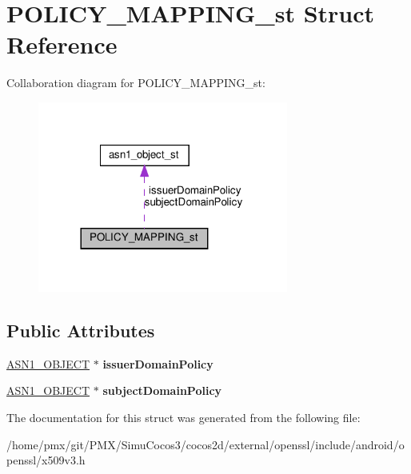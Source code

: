 \hypertarget{structPOLICY__MAPPING__st}{}\section{P\+O\+L\+I\+C\+Y\+\_\+\+M\+A\+P\+P\+I\+N\+G\+\_\+st Struct Reference}
\label{structPOLICY__MAPPING__st}


Collaboration diagram for P\+O\+L\+I\+C\+Y\+\_\+\+M\+A\+P\+P\+I\+N\+G\+\_\+st\+:
\nopagebreak
\begin{figure}[H]
\begin{center}
\leavevmode
\includegraphics[width=233pt]{structPOLICY__MAPPING__st__coll__graph}
\end{center}
\end{figure}
\subsection*{Public Attributes}
\begin{DoxyCompactItemize}
\item 
\mbox{\label{structPOLICY__MAPPING__st_ae9c08a53decb8a8ff66bdccb0c76b991}} 
\hyperlink{structasn1__object__st}{A\+S\+N1\+\_\+\+O\+B\+J\+E\+CT} $\ast$ {\bfseries issuer\+Domain\+Policy}
\item 
\mbox{\label{structPOLICY__MAPPING__st_a7808049ac87cbdaa4b74d55c0f72738c}} 
\hyperlink{structasn1__object__st}{A\+S\+N1\+\_\+\+O\+B\+J\+E\+CT} $\ast$ {\bfseries subject\+Domain\+Policy}
\end{DoxyCompactItemize}


The documentation for this struct was generated from the following file\+:\begin{DoxyCompactItemize}
\item 
/home/pmx/git/\+P\+M\+X/\+Simu\+Cocos3/cocos2d/external/openssl/include/android/openssl/x509v3.\+h\end{DoxyCompactItemize}
